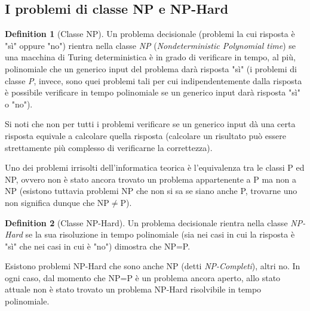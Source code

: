 \documentclass[12pt, a4paper]{report}
\theoremstyle{definition}
\newtheorem{definition}{Definition}[section]
\begin{document}
			\subsection{I problemi di classe NP e NP-Hard}
				\begin{definition}[Classe NP]
					Un problema decisionale (problemi la cui risposta è "sì" oppure "no") rientra nella classe \emph{NP} (\emph{Nondeterministic Polynomial time}) se una macchina di Turing deterministica è in grado di verificare in tempo, al più, polinomiale che un generico input del problema darà risposta "sì" (i problemi di classe \emph{P}, invece, sono quei problemi tali per cui indipendentemente dalla risposta è possibile verificare in tempo polinomiale se un generico input darà risposta "sì" o "no").
					
					Si noti che non per tutti i problemi verificare se un generico input dà una certa risposta equivale a calcolare quella risposta (calcolare un risultato può essere strettamente più complesso di verificarne la correttezza).
					
					Uno dei problemi irrisolti dell'informatica teorica è l'equivalenza tra le classi P ed NP, ovvero non è stato ancora trovato un problema appartenente a P ma non a NP (esistono tuttavia problemi NP che non si sa se siano anche P, trovarne uno non significa dunque che NP$\neq$P).
				\end{definition}
				\begin{definition}[Classe NP-Hard]
					Un problema decisionale rientra nella classe \emph{NP-Hard} se la sua risoluzione in tempo polinomiale (sia nei casi in cui la risposta è "sì" che nei casi in cui è "no") dimostra che NP=P.
					
					Esistono problemi NP-Hard che sono anche NP (detti \emph{NP-Completi}), altri no. In ogni caso, dal momento che NP=P è un problema ancora aperto, allo stato attuale non è stato trovato un problema NP-Hard risolvibile in tempo polinomiale.
				\end{definition}
\end{document}
